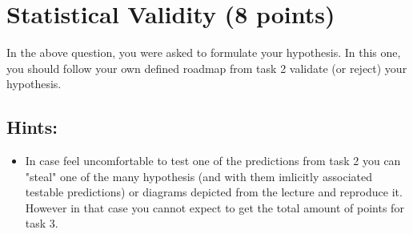 \documentclass{WeSTassignment}
\begin{document}
\section{Statistical Validity (8 points)}
In the above question, you were asked to formulate your hypothesis. In this one, you should follow your own defined roadmap from task 2 validate (or reject) your hypothesis. 

\subsection{Hints:}
\begin{itemize}
\item In case feel uncomfortable to test one of the predictions from task 2 you can "steal" one of the many hypothesis (and with them imlicitly associated testable predictions) or diagrams depicted from the lecture and reproduce it. However in that case you cannot expect to get the total amount of points for task 3. 
\end{itemize}







\makefooter
\end{document}
